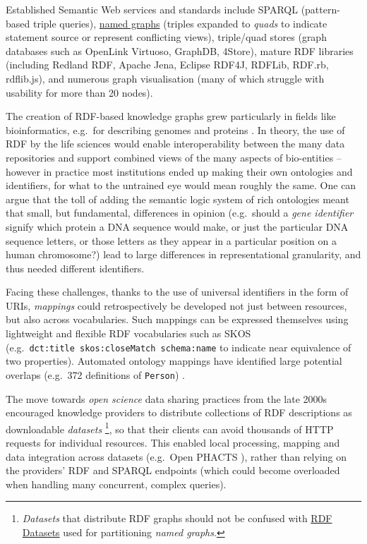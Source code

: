\documentclass[fleqn,10pt,lineno]{wlpeerjlua}
\begin{document}
Established Semantic Web services and standards include SPARQL \cite{xww8fb1B} (pattern-based triple queries), \href{https://www.w3.org/TR/rdf11-concepts/\#section-dataset}{named graphs} (triples expanded to \emph{quads} to indicate statement source or represent conflicting views), triple/quad stores (graph databases such as OpenLink Virtuoso, GraphDB, 4Store), mature RDF libraries (including Redland RDF, Apache Jena, Eclipse RDF4J, RDFLib, RDF.rb, rdflib.js), and numerous graph visualisation (many of which struggle with usability for more than 20 nodes).

The creation of RDF-based knowledge graphs grew particularly in fields like bioinformatics, e.g.~for describing genomes and proteins \cite{bMSxa8XW,Qlrlr2TZ}. In theory, the use of RDF by the life sciences would enable interoperability between the many data repositories and support combined views of the many aspects of bio-entities -- however in practice most institutions ended up making their own ontologies and identifiers, for what to the untrained eye would mean roughly the same. One can argue that the toll of adding the semantic logic system of rich ontologies meant that small, but fundamental, differences in opinion (e.g.~should a \emph{gene identifier} signify which protein a DNA sequence would make, or just the particular DNA sequence letters, or those letters as they appear in a particular position on a human chromosome?) lead to large differences in representational granularity, and thus needed different identifiers.

Facing these challenges, thanks to the use of universal identifiers in the form of URIs, \emph{mappings} could retrospectively be developed not just between resources, but also across vocabularies. Such mappings can be expressed themselves using lightweight and flexible RDF vocabularies such as SKOS \cite{15gQDya5B} (e.g.~\texttt{dct:title\ skos:closeMatch\ schema:name} to indicate near equivalence of two properties). Automated ontology mappings have identified large potential overlaps (e.g.~372 definitions of \texttt{Person}) \cite{FDDmgO6s} .

The move towards \emph{open science} data sharing practices from the late 2000s encouraged knowledge providers to distribute collections of RDF descriptions as downloadable \emph{datasets} \footnote{\emph{Datasets} that distribute RDF graphs should not be confused with \href{https://www.w3.org/TR/rdf11-concepts/\#section-dataset}{RDF Datasets} used for partitioning \emph{named graphs}.}, so that their clients can avoid thousands of HTTP requests for individual resources. This enabled local processing, mapping and data integration across datasets (e.g.~Open PHACTS \cite{191ZkYZMt}), rather than relying on the providers' RDF and SPARQL endpoints (which could become overloaded when handling many concurrent, complex queries).
\end{document}
